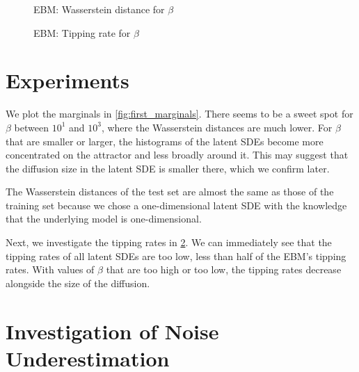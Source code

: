\documentclass[twoside,11pt]{article}
\begin{document}
\begin{figure}
    \begin{center}
    
    \end{center}
    \caption{EBM: Wasserstein distance for \(\beta\)}
    \label{fig:first_wasserstein}
\end{figure}

\begin{figure}
    \begin{center}
    
    \end{center}
    \caption{EBM: Tipping rate for \(\beta\)}
    \label{fig:first_tipping_rate}
\end{figure}

\section{Experiments}

We plot the marginals in \cref{fig:first_marginals}. There seems to be a sweet spot for \(\beta\) between \(10^1\) and \(10^3\), where the Wasserstein distances are much lower. For \(\beta\) that are smaller or larger, the histograms of the latent SDEs become more concentrated on the attractor and less broadly around it. This may suggest that the diffusion size in the latent SDE is smaller there, which we confirm later.

The Wasserstein distances of the test set are almost the same as those of the training set because we chose a one-dimensional latent SDE with the knowledge that the underlying model is one-dimensional.

Next, we investigate the tipping rates in \cref{fig:first_tipping_rate}. We can immediately see that the tipping rates of all latent SDEs are too low, less than half of the EBM's tipping rates. With values of \(\beta\) that are too high or too low, the tipping rates decrease alongside the size of the diffusion.


\section{Investigation of Noise Underestimation}
\end{document}
